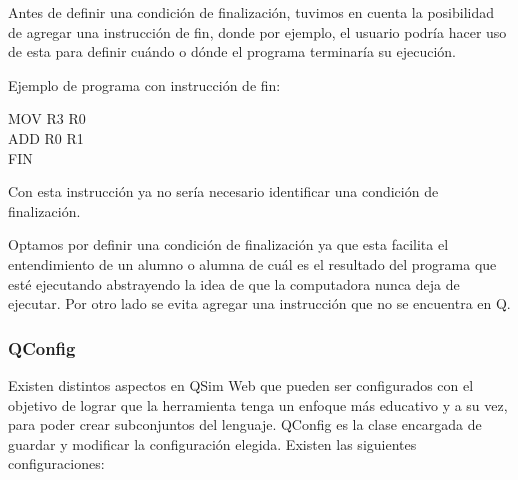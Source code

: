 Antes de definir una condición de finalización, tuvimos en cuenta la posibilidad de agregar una instrucción de fin, donde por ejemplo,
el usuario podría hacer uso de esta para definir cuándo o dónde el programa terminaría su ejecución.

Ejemplo de programa con instrucción de fin:
\begin{center}
  MOV R3 R0 \\
  ADD R0 R1 \\
  FIN \\
\end{center}

Con esta instrucción ya no sería necesario identificar una condición de finalización.

Optamos por definir una condición de finalización ya que esta facilita el entendimiento de un alumno o alumna de cuál es el resultado del 
programa que esté ejecutando abstrayendo la idea de que la computadora nunca deja de ejecutar. Por otro lado se evita agregar una instrucción que no 
se encuentra en Q.


\subsubsection*{QConfig}
\label{subsec:qconfig}
Existen distintos aspectos en QSim Web que pueden ser configurados con el objetivo de lograr que la herramienta tenga un enfoque más educativo y a su vez, 
para poder crear subconjuntos del lenguaje. QConfig es la clase encargada de guardar y modificar la configuración elegida. Existen las siguientes 
configuraciones:

